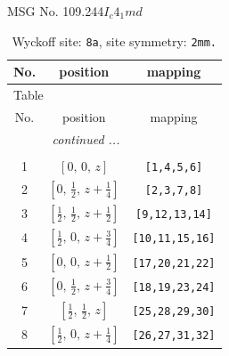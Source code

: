 \documentclass[fleqn,8pt]{jsarticle}
\begin{document}
\setcounter{MaxMatrixCols}{32}

\renewcommand{\tablename}{Table~}
\renewcommand{\figurename}{Figure~}
\begin{center}
\LARGE
MSG No. 109.244\quad$I_{c}4_{1}md$
\end{center}
\renewcommand{\arraystretch}{1.2}
\begin{longtable}{ccc}
\caption{Wyckoff site: {\tt 8a}, site symmetry: {\tt 2mm.}}
 \\
 \hline \hline
No. & position & mapping \\ \hline \endfirsthead

\multicolumn{2}{l}{\tablename\ \thetable{}} \\
 \hline \hline
No. & position & mapping \\ \hline \endhead

 \hline \hline
\multicolumn{2}{r}{\footnotesize\it continued ...} \\ \endfoot

 \hline \hline
\multicolumn{2}{r}{} \\ \endlastfoot

1 & $\left[ 0,\, 0,\, z \right]$ & {\tt [1,4,5,6]} \\ \hline
2 & $\left[ 0,\, \frac{1}{2},\, z + \frac{1}{4} \right]$ & {\tt [2,3,7,8]} \\ \hline
3 & $\left[ \frac{1}{2},\, \frac{1}{2},\, z + \frac{1}{2} \right]$ & {\tt [9,12,13,14]} \\ \hline
4 & $\left[ \frac{1}{2},\, 0,\, z + \frac{3}{4} \right]$ & {\tt [10,11,15,16]} \\ \hline
5 & $\left[ 0,\, 0,\, z + \frac{1}{2} \right]$ & {\tt [17,20,21,22]} \\ \hline
6 & $\left[ 0,\, \frac{1}{2},\, z + \frac{3}{4} \right]$ & {\tt [18,19,23,24]} \\ \hline
7 & $\left[ \frac{1}{2},\, \frac{1}{2},\, z \right]$ & {\tt [25,28,29,30]} \\ \hline
8 & $\left[ \frac{1}{2},\, 0,\, z + \frac{1}{4} \right]$ & {\tt [26,27,31,32]} \\
\end{longtable}
\renewcommand{\arraystretch}{1.2}
\end{document}
